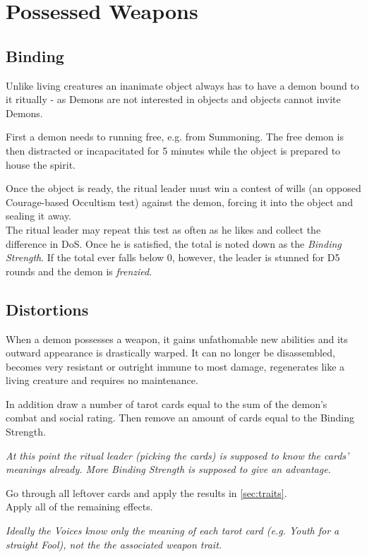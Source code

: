 \section{Possessed Weapons}
\label{sec:possessedweapon}
\subsection{Binding}
Unlike living creatures an inanimate object always has to have a demon bound to it ritually
- as Demons are not interested in objects and objects cannot invite Demons.
\par
First a demon needs to running free, e.g. from Summoning.
The free demon is then distracted or incapacitated for 5 minutes while the object is prepared to house the spirit.
\par
Once the object is ready, the ritual leader must win a contest of wills
	(an opposed Courage-based Occultism test)
	against the demon, forcing it into the object and sealing it away.
\\%
The ritual leader may repeat this test as often as he likes and collect the difference in DoS.
Once he is satisfied, the total is noted down as the \emph{Binding Strength}.
If the total ever falls below 0, however,
	the leader is stunned for D5 rounds
	and the demon is \emph{frenzied}.

\subsection{Distortions}
When a demon possesses a weapon, it gains unfathomable new abilities and its outward appearance is drastically warped.
It can no longer be disassembled, becomes very resistant or outright immune to most damage, regenerates like a living creature and requires no maintenance.
\par
In addition draw a number of tarot cards equal to
	the sum of the demon's combat and social rating.
Then remove an amount of cards equal to the Binding Strength.
\begin{exampleblock}
	\itshape
	At this point the ritual leader (picking the cards) is supposed to know the cards' meanings already.
	More Binding Strength is supposed to give an advantage.
\end{exampleblock}
Go through all leftover cards and apply the results in \ref{sec:traits}.
\\%
Apply all of the remaining effects.
\begin{exampleblock}
	\itshape
	Ideally the Voices know only the meaning of each tarot card
	(e.g. \emph{Youth} for a straight Fool),
	not the the associated weapon trait.
\end{exampleblock}

